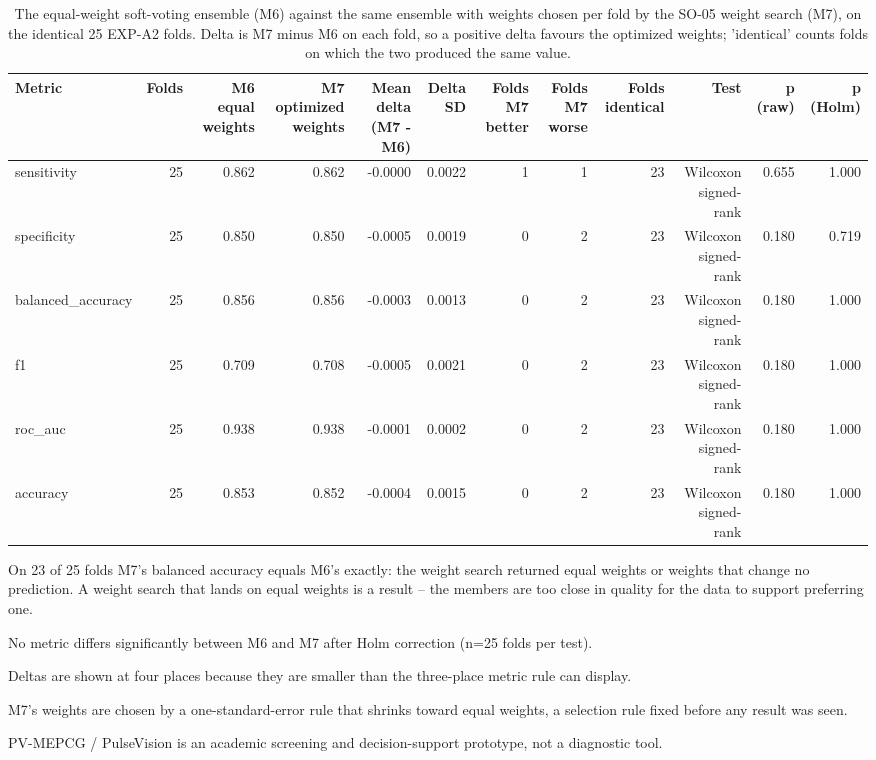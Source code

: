 \begin{table}[htbp]
  \centering
  \caption{The equal-weight soft-voting ensemble (M6) against the same ensemble with weights chosen per fold by the SO-05 weight search (M7), on the identical 25 EXP-A2 folds. Delta is M7 minus M6 on each fold, so a positive delta favours the optimized weights; 'identical' counts folds on which the two produced the same value.}
  \label{tab:t09}
  \begin{tabular}{lrrrrrrrrrrr}
    \toprule
    Metric & Folds & M6 equal weights & M7 optimized weights & Mean delta (M7 - M6) & Delta SD & Folds M7 better & Folds M7 worse & Folds identical & Test & p (raw) & p (Holm) \\
    \midrule
    sensitivity & 25 & 0.862 & 0.862 & -0.0000 & 0.0022 & 1 & 1 & 23 & Wilcoxon signed-rank & 0.655 & 1.000 \\
    specificity & 25 & 0.850 & 0.850 & -0.0005 & 0.0019 & 0 & 2 & 23 & Wilcoxon signed-rank & 0.180 & 0.719 \\
    balanced\_accuracy & 25 & 0.856 & 0.856 & -0.0003 & 0.0013 & 0 & 2 & 23 & Wilcoxon signed-rank & 0.180 & 1.000 \\
    f1 & 25 & 0.709 & 0.708 & -0.0005 & 0.0021 & 0 & 2 & 23 & Wilcoxon signed-rank & 0.180 & 1.000 \\
    roc\_auc & 25 & 0.938 & 0.938 & -0.0001 & 0.0002 & 0 & 2 & 23 & Wilcoxon signed-rank & 0.180 & 1.000 \\
    accuracy & 25 & 0.853 & 0.852 & -0.0004 & 0.0015 & 0 & 2 & 23 & Wilcoxon signed-rank & 0.180 & 1.000 \\
    \bottomrule
  \end{tabular}
  \par\footnotesize On 23 of 25 folds M7's balanced accuracy equals M6's exactly: the weight search returned equal weights or weights that change no prediction. A weight search that lands on equal weights is a result -- the members are too close in quality for the data to support preferring one.
  \par\footnotesize No metric differs significantly between M6 and M7 after Holm correction (n=25 folds per test).
  \par\footnotesize Deltas are shown at four places because they are smaller than the three-place metric rule can display.
  \par\footnotesize M7's weights are chosen by a one-standard-error rule that shrinks toward equal weights, a selection rule fixed before any result was seen.
  \par\footnotesize PV-MEPCG / PulseVision is an academic screening and decision-support prototype, not a diagnostic tool.
\end{table}
